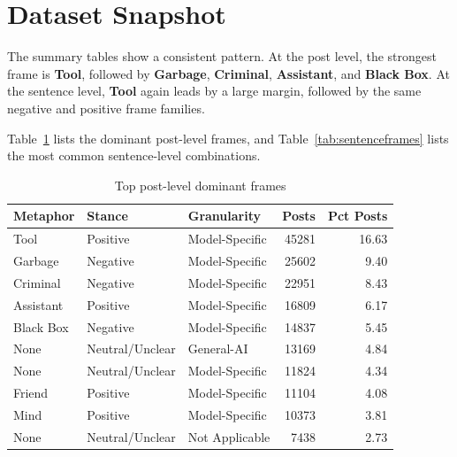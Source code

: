 \documentclass[11pt]{article}
\begin{document}
\section{Dataset Snapshot}
The summary tables show a consistent pattern. At the post level, the strongest frame is \textbf{Tool}, followed by \textbf{Garbage}, \textbf{Criminal}, \textbf{Assistant}, and \textbf{Black Box}. At the sentence level, \textbf{Tool} again leads by a large margin, followed by the same negative and positive frame families.

Table~\ref{tab:postframes} lists the dominant post-level frames, and Table~\ref{tab:sentenceframes} lists the most common sentence-level combinations.

\begin{table}[H]
\centering
\caption{Top post-level dominant frames}
\label{tab:postframes}
\begin{tabular}{l l l r r}
\toprule
Metaphor & Stance & Granularity & Posts & Pct Posts \\
\midrule
Tool & Positive & Model-Specific & 45281 & 16.63 \\
Garbage & Negative & Model-Specific & 25602 & 9.40 \\
Criminal & Negative & Model-Specific & 22951 & 8.43 \\
Assistant & Positive & Model-Specific & 16809 & 6.17 \\
Black Box & Negative & Model-Specific & 14837 & 5.45 \\
None & Neutral/Unclear & General-AI & 13169 & 4.84 \\
None & Neutral/Unclear & Model-Specific & 11824 & 4.34 \\
Friend & Positive & Model-Specific & 11104 & 4.08 \\
Mind & Positive & Model-Specific & 10373 & 3.81 \\
None & Neutral/Unclear & Not Applicable & 7438 & 2.73 \\
\bottomrule
\end{tabular}
\end{table}
\end{document}
